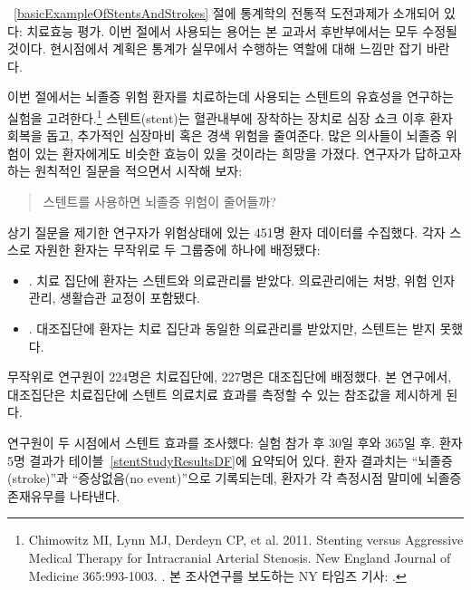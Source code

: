 
~\ref{basicExampleOfStentsAndStrokes} 절에 통계학의 전통적 도전과제가 소개되어 있다: 치료효능 평가. 이번 절에서 사용되는 용어는 본 교과서 후반부에서는 모두 수정될 것이다. 현시점에서 계획은 통계가 실무에서 수행하는 역할에 대해 느낌만 잡기 바란다.

이번 절에서는 뇌졸증 위험 환자를 치료하는데 사용되는 스텐트의 유효성을 연구하는 실험을 고려한다.\footnote{Chimowitz MI, Lynn MJ, Derdeyn CP, et al. 2011. Stenting versus Aggressive Medical Therapy for Intracranial Arterial Stenosis. New England Journal of Medicine 365:993-1003. . 본 조사연구를 보도하는 NY 타임즈 기사: .} 
스텐트(stent)는 혈관내부에 장착하는 장치로 심장 쇼크 이후 환자회복을 돕고, 추가적인 심장마비 혹은 경색 위험을 줄여준다.
많은 의사들이 뇌졸증 위험이 있는 환자에게도 비슷한 효능이 있을 것이라는 희망을 가졌다.
연구자가 답하고자 하는 원칙적인 질문을 적으면서 시작해 보자:

\begin{quote}
스텐트를 사용하면 뇌졸증 위험이 줄어들까?
\end{quote}

상기 질문을 제기한 연구자가 위험상태에 있는 451명 환자 데이터를 수집했다.
각자 스스로 자원한 환자는 무작위로 두 그룹중에 하나에 배정됐다:

\begin{itemize}
\item[]. 치료 집단에 환자는 스텐트와 의료관리를 받았다. 의료관리에는 처방, 위험 인자 관리, 생활습관 교정이 포함됐다.
\item[]. 
대조집단에 환자는 치료 집단과 동일한 의료관리를 받았지만, 스텐트는 받지 못했다.
\end{itemize}

무작위로 연구원이 224명은 치료집단에, 227명은 대조집단에 배정했다.
본 연구에서, 대조집단은 치료집단에 스텐트 의료치료 효과를 측정할 수 있는 참조값을 제시하게 된다.

연구원이 두 시점에서 스텐트 효과를 조사했다: 실험 참가 후 30일 후와 365일 후.
환자 5명 결과가 테이블~\ref{stentStudyResultsDF}에 요약되어 있다.
환자 결과치는 ``뇌졸증(stroke)''과 ``증상없음(no event)''으로 기록되는데, 환자가 각 측정시점 말미에 뇌졸증 존재유무를 나타낸다.



